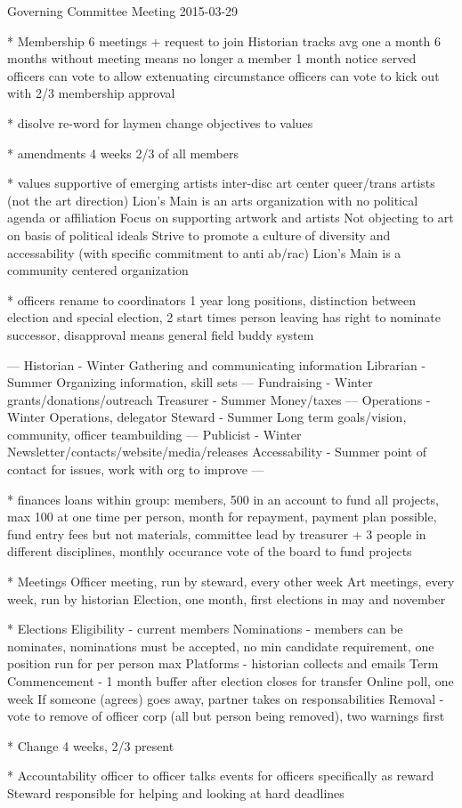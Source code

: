 Governing Committee Meeting 2015-03-29

* Membership
6 meetings + request to join
Historian tracks
avg one a month
6 months without meeting means no longer a member
1 month notice served
officers can vote to allow extenuating circumstance
officers can vote to kick out with 2/3 membership approval

* disolve
re-word for laymen
change objectives to values

* amendments
4 weeks
2/3 of all members

* values
supportive of emerging artists
inter-disc art
center queer/trans artists (not the art direction)
Lion's Main is an arts organization with no political agenda or affiliation
Focus on supporting artwork and artists
Not objecting to art on basis of political ideals
Strive to promote a culture of diversity and accessability (with specific commitment to anti ab/rac)
Lion's Main is a community centered organization

* officers
rename to coordinators
1 year long positions, distinction between election and special election, 2 start times
person leaving has right to nominate successor, disapproval means general field
buddy system

---
Historian - Winter
  Gathering and communicating information
Librarian - Summer
  Organizing information, skill sets
---
Fundraising - Winter
  grants/donations/outreach
Treasurer - Summer
  Money/taxes
---
Operations - Winter
  Operations, delegator
Steward - Summer
  Long term goals/vision, community, officer teambuilding
---
Publicist - Winter
  Newsletter/contacts/website/media/releases
Accessability - Summer
  point of contact for issues, work with org to improve
---

* finances
loans within group: members, 500 in an account to fund all projects, max 100 at one time per person, month for repayment, payment plan possible, fund entry fees but not materials, committee lead by treasurer + 3 people in different disciplines, monthly occurance
vote of the board to fund projects

* Meetings
Officer meeting, run by steward, every other week
Art meetings, every week, run by historian
Election, one month, first elections in may and november

* Elections
Eligibility - current members
Nominations - members can be nominates, nominations must be accepted, no min candidate requirement, one position run for per person max
Platforms - historian collects and emails
Term Commencement - 1 month buffer after election closes for transfer
Online poll, one week
If someone (agrees) goes away, partner takes on responsabilities
Removal - vote to remove of officer corp (all but person being removed), two warnings first

* Change
4 weeks, 2/3 present

* Accountability
officer to officer talks
events for officers specifically as reward
Steward responsible for helping and looking at hard deadlines
